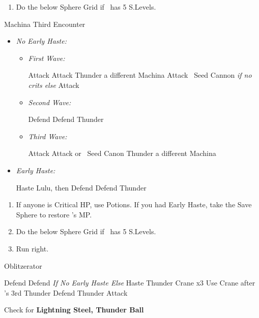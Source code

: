 \begin{enumerate}[resume]
    \item Do the below Sphere Grid if \tidus\ has 5 S.Levels.
\end{enumerate}
\vfill
\begin{battle}{Machina Third Encounter}
    \begin{itemize}
        \item \textit{No Early Haste:}
        \begin{itemize}
            \item \textit{First Wave:}
            \begin{itemize}
                \tidusf Attack
                \kimahrif Attack
                \luluf Thunder a different Machina
                \tidusf Attack
                \kimahrif \od\ Seed Cannon \textit{if no crits else} Attack
            \end{itemize}
            \item \textit{Second Wave:}
            \begin{itemize}
                \tidusf Defend
                \kimahrif Defend
                \luluf Thunder
            \end{itemize}
            \item \textit{Third Wave:}
            \begin{itemize}
                \tidusf Attack
                \kimahrif Attack or \od\ Seed Canon
                \luluf Thunder a different Machina
            \end{itemize}
        \end{itemize}
        \item \textit{Early Haste:}
        \begin{itemize}
            \tidusf Haste Lulu, then Defend
            \kimahrif Defend
            \luluf Thunder
        \end{itemize}
    \end{itemize}
\end{battle}
\begin{enumerate}[resume]
    \item If anyone is Critical HP, use Potions. If you had Early Haste, take the Save Sphere to restore \tidus's MP.
    \item Do the below Sphere Grid if \tidus\ has 5 S.Levels.
    \item Run right.
\end{enumerate}
\begin{battle}[3000]{Oblitzerator}
    \begin{itemize}
        \kimahrif Defend
        \tidusf Defend \textit{If No Early Haste Else} Haste \lulu
        \luluf Thunder Crane x3
        \tidusf Use Crane after \lulu's 3rd Thunder
        \kimahrif Defend
        \luluf Thunder
        \tidusf Attack
    \end{itemize}
    Check for \textbf{Lightning Steel, Thunder Ball}
\end{battle}
